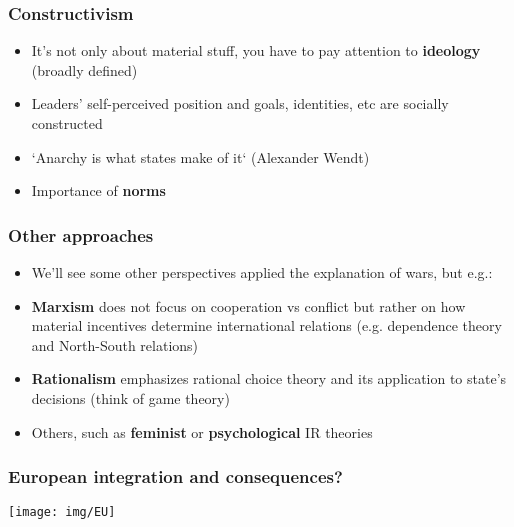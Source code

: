 \documentclass[aspectratio=43,handout]{beamer}
\begin{document}
\begin{frame}
\frametitle{Constructivism}
\centering

\begin{itemize}
  \item<1-> It's not only about material stuff, you have to pay attention to \textbf{ideology} (broadly defined)
  \item<2-> Leaders' self-perceived position and goals, identities, etc are socially constructed
  \item<2-> `Anarchy is what states make of it` (Alexander Wendt)
  \item<3-> Importance of \textbf{norms}
\end{itemize}

\end{frame}

\begin{frame}
\frametitle{Other approaches}
\centering

\begin{itemize}[<+->]
  \item We'll see some other perspectives applied the explanation of wars, but e.g.:
  \item \textbf{Marxism} does not focus on cooperation vs conflict but rather on how material incentives determine international relations (e.g. dependence theory and North-South relations)
  \item \textbf{Rationalism} emphasizes rational choice theory and its application to state's decisions (think of game theory)
  \item Others, such as \textbf{feminist} or \textbf{psychological} IR theories
\end{itemize}

\end{frame}


\begin{frame}
\frametitle{European integration and consequences?}
\centering

\texttt{[image: img/EU]}

\end{frame}
\end{document}
